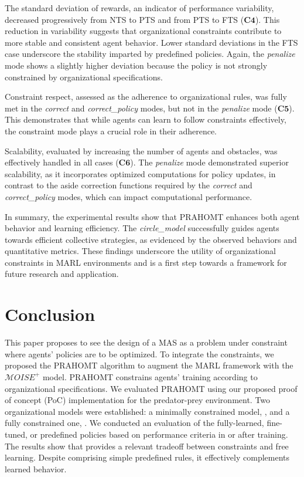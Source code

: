 \documentclass[runningheads]{llncs}
\theoremstyle{freethm}
\theoremstyle{proofoutline}
\newcounter{proof}
\begin{document}
The standard deviation of rewards, an indicator of performance variability, decreased progressively from NTS to PTS and from PTS to FTS ($\mathbf{C4}$). This reduction in variability suggests that organizational constraints contribute to more stable and consistent agent behavior. Lower standard deviations in the FTS case underscore the stability imparted by predefined policies. Again, the \textit{penalize} mode shows a slightly higher deviation because the policy is not strongly constrained by organizational specifications.

Constraint respect, assessed as the adherence to organizational rules, was fully met in the \textit{correct} and \textit{correct\_policy} modes, but not in the \textit{penalize} mode ($\mathbf{C5}$). This demonstrates that while agents can learn to follow constraints effectively, the constraint mode plays a crucial role in their adherence.

Scalability, evaluated by increasing the number of agents and obstacles, was effectively handled in all cases ($\mathbf{C6}$). The \textit{penalize} mode demonstrated superior scalability, as it incorporates optimized computations for policy updates, in contrast to the aside correction functions required by the \textit{correct} and \textit{correct\_policy} modes, which can impact computational performance.

In summary, the experimental results show that PRAHOMT enhances both agent behavior and learning efficiency. The \textit{circle\_model} successfully guides agents towards efficient collective strategies, as evidenced by the observed behaviors and quantitative metrics. These findings underscore the utility of organizational constraints in MARL environments and is a first step towards a framework for future research and application.


\section{Conclusion}\label{sec:conclusion}

This paper proposes to see the design of a MAS as a problem under constraint where agents' policies are to be optimized. To integrate the constraints, we proposed the PRAHOMT algorithm to augment the MARL framework with the $\mathcal{M}OISE^+$ model. PRAHOMT constrains agents' training according to organizational specifications. We evaluated PRAHOMT using our proposed proof of concept (PoC) implementation for the  predator-prey environment. Two organizational models were established: a minimally constrained model, , and a fully constrained one, . We conducted an evaluation of the fully-learned, fine-tuned, or predefined policies based on performance criteria in or after training.
%
The results show that  provides a relevant tradeoff between constraints and free learning. Despite comprising simple predefined rules, it effectively complements learned behavior.
\end{document}
